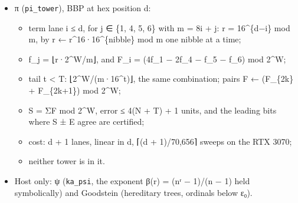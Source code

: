 \begin{itemize}
\begin{itemize}
\begin{itemize}
\item phase one, a thread a term: find the leftmost outermost redex (λM)N; a normal form settles;
\item phase two: each reduct token is a plan (depth D, bound k, body, argument) gathered from its source token by the index. The record program computes (λM)N → M[N], with a body variable i > D + 1 ↦ i − 1, an argument variable i > k ↦ i + D, and every other token copied. It is imprinted at the round's widths;
\item phase three: the same decisions as \texttt{omega\_\allowbreak{}run}, namely halt at a normal form, loop by Brent's watcher, grows forever by the spine proof;
\item settled terms leave as one record; kept terms move into the next round's rooms;
\item a job (≤ 2\textasciicircum{}22 terms of one length) is admitted once fewer than 2\textasciicircum{}21 are live;
\item a term the device cannot hold is parked as outgrown, and a stop leaves the live terms open;
\item the run is one tessera job.
\end{itemize}
\end{itemize}
\item π (\texttt{pi\_\allowbreak{}tower}), BBP at hex position d:

\begin{itemize}
\item term lane i ≤ d, for j ∈ \{1, 4, 5, 6\} with m = 8i + j: r = 16\textasciicircum{}\{d−i\} mod m, by r ← r\textasciicircum{}16·16\textasciicircum{}\{nibble\} mod m one nibble at a time;
\item f\_\allowbreak{}j = ⌊r·2\textasciicircum{}W/m⌋, and F\_\allowbreak{}i = (4f\_\allowbreak{}1 − 2f\_\allowbreak{}4 − f\_\allowbreak{}5 − f\_\allowbreak{}6) mod 2\textasciicircum{}W;
\item tail t < T: ⌊2\textasciicircum{}W/(m·16\textasciicircum{}t)⌋, the same combination; pairs F ← (F\_\allowbreak{}\{2k\} + F\_\allowbreak{}\{2k+1\}) mod 2\textasciicircum{}W;
\item S = ΣF mod 2\textasciicircum{}W, error ≤ 4(N + T) + 1 units, and the leading bits where S ± E agree are certified;
\item cost: d + 1 lanes, linear in d, ⌈(d + 1)/70,656⌉ sweeps on the RTX 3070;
\item neither tower is in it.
\end{itemize}
\item Host only: ψ (\texttt{ka\_\allowbreak{}psi}, the exponent β(r) = (nʳ − 1)/(n − 1) held symbolically) and Goodstein (hereditary trees, ordinals below ε₀).
\end{itemize}


